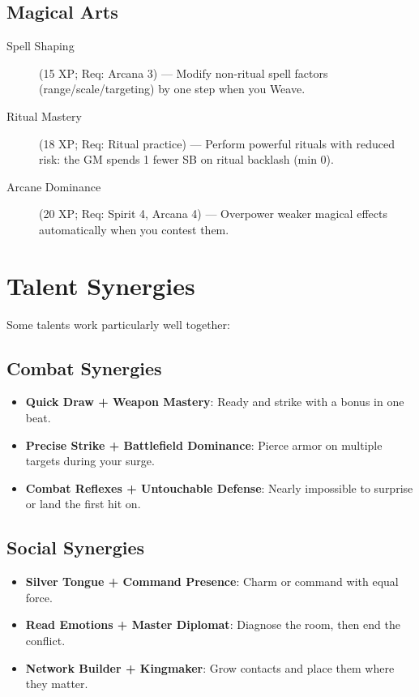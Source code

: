 \begin{multicols}{2}
\subsection*{Magical Arts}
\begin{description}
\item[Spell Shaping] (15 XP; Req: Arcana 3) --- Modify non-ritual spell factors (range/scale/targeting) by one step when you Weave.
\item[Ritual Mastery] (18 XP; Req: Ritual practice) --- Perform powerful rituals with reduced risk: the GM spends 1 fewer SB on ritual backlash (min 0).
\item[Arcane Dominance] (20 XP; Req: Spirit 4, Arcana 4) --- Overpower weaker magical effects automatically when you contest them.
\end{description}

\section{Talent Synergies}

Some talents work particularly well together:

\subsection*{Combat Synergies}
\begin{itemize}
\item \textbf{Quick Draw + Weapon Mastery}: Ready and strike with a bonus in one beat.
\item \textbf{Precise Strike + Battlefield Dominance}: Pierce armor on multiple targets during your surge.
\item \textbf{Combat Reflexes + Untouchable Defense}: Nearly impossible to surprise or land the first hit on.
\end{itemize}

\subsection*{Social Synergies}
\begin{itemize}
\item \textbf{Silver Tongue + Command Presence}: Charm or command with equal force.
\item \textbf{Read Emotions + Master Diplomat}: Diagnose the room, then end the conflict.
\item \textbf{Network Builder + Kingmaker}: Grow contacts and place them where they matter.
\end{itemize}


\end{multicols}
